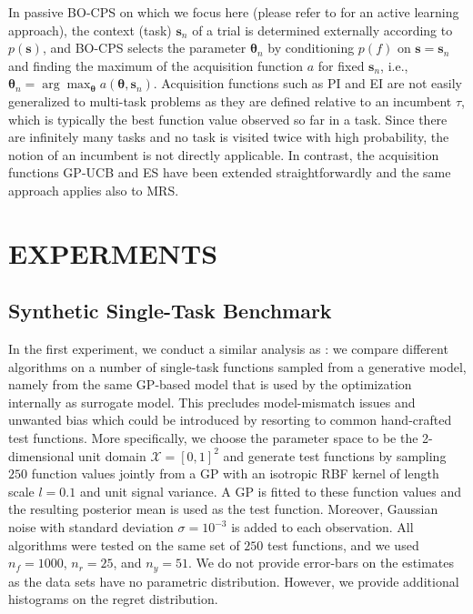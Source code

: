 \documentclass[10pt,letterpaper]{article} %
\begin{document}
In passive BO-CPS on which we focus here (please refer to
\citet{metzen_active_2015} for an active learning approach), the context (task)
$\mathbf{s}_n$ of a trial is determined externally according to $p(\mathbf{s})$,
and BO-CPS selects the parameter $\mathbf{\theta}_n$ by conditioning $p(f)$ on
$\mathbf{s}=\mathbf{s}_n$ and finding the maximum of the acquisition function
$a$ for fixed $\mathbf{s}_n$, i.e., $\mathbf{\theta}_n =
\arg\max_\mathbf{\theta} a(\mathbf{\theta}, \mathbf{s}_n)$. Acquisition
functions such as PI and EI are not easily generalized to multi-task problems as they are
defined relative to an incumbent $\tau$, which is typically the best function
value observed so far in a task. Since there are infinitely many tasks and no
task is visited twice with high probability, the notion of an incumbent is not
directly applicable.  In contrast, the acquisition functions GP-UCB
\cite{srinivas_gaussian_2010} and ES \cite{metzen_bayesian_2015} have been extended
straightforwardly and the same approach applies also to MRS.

\section{EXPERMENTS}

\subsection{Synthetic Single-Task Benchmark} \label{Section:ResultsSingleTask}

In the first experiment, we conduct a similar analysis as \citet[Section
3.1]{hennig_entropy_2012}: we compare different algorithms on a number of
single-task functions sampled from a generative model, namely from the same GP-based model
that is used by the optimization internally as surrogate model. This precludes
model-mismatch issues and unwanted bias which could be introduced by resorting
to common hand-crafted test functions. More specifically, we choose the
parameter space to be the 2-dimensional unit domain $\mathcal{X} = [0, 1]^2$ and generate test
functions by sampling $250$ function values jointly from a GP with an isotropic RBF kernel
of length scale $l = 0.1$ and unit signal variance. A GP is
fitted to these function values and the resulting posterior mean is used as the
test function. Moreover, Gaussian noise with standard deviation $\sigma =
10^{-3}$ is added to each observation. All algorithms were tested on the same
set of $250$ test functions, and we used $n_f=1000$, $n_r=25$, and $n_y=51$.
We do not provide error-bars on the estimates as the data sets have no parametric distribution. However, we provide additional histograms on the regret distribution.
\end{document}

